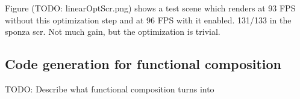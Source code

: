 Figure (TODO: linearOptScr.png) shows a test scene which renders at 93 FPS without this optimization step and at 96 FPS with it enabled. 131/133 in the sponza scr. Not much gain, but the optimization is trivial.

\subsection{Code generation for functional composition}

TODO: Describe what functional composition turns into
